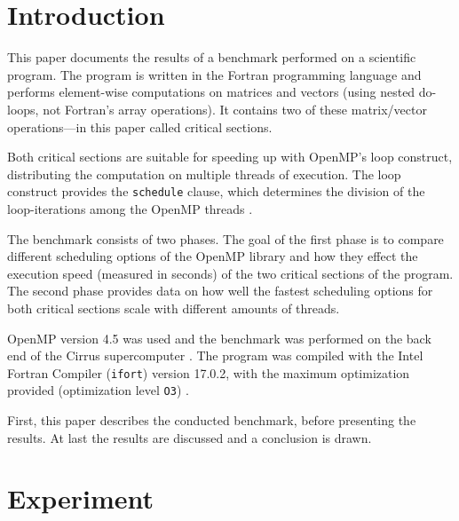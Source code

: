 \documentclass[twoside,11pt]{article}
\title{\titl}
\author{\name Jonas Fassbender
        \email jonas@fassbender.dev}
\begin{document}
\maketitle

\begin{abstract}
\end{abstract}

\begin{keywords}
\end{keywords}

\section{Introduction} %

This paper documents the results of a benchmark performed
on a scientific program.
The program is written in the Fortran programming language
and performs element-wise computations on matrices and
vectors (using nested do-loops, not Fortran's array
operations).
It contains two of these matrix/vector operations---in this
paper called critical sections.

Both critical sections are suitable for speeding up with
OpenMP's loop construct, distributing the computation on
multiple threads of execution.
The loop construct provides the \texttt{schedule} clause,
which determines the division of the loop-iterations
among the OpenMP threads
\citep[see][Chapter 2.7.1]{openmp}.

The benchmark consists of two phases.
The goal of the first phase is to compare different
scheduling options of the OpenMP library and how they
effect the execution speed (measured in seconds) of the two
critical sections of the program.
The second phase provides data on how well the fastest
scheduling options for both critical sections scale with
different amounts of threads.

OpenMP version 4.5 was used and the benchmark was performed
on the back end of the Cirrus supercomputer
\citep[see][]{openmp, cirrus}.
The program was compiled with the Intel Fortran Compiler
(\texttt{ifort}) version 17.0.2, with the maximum
optimization provided (optimization level \texttt{O3})
\citep[see][]{ifort}.

First, this paper describes the conducted benchmark,
before presenting the results. At last the results are
discussed and a conclusion is drawn.


\section{Experiment} %
\label{sec:exp}
\end{document}
